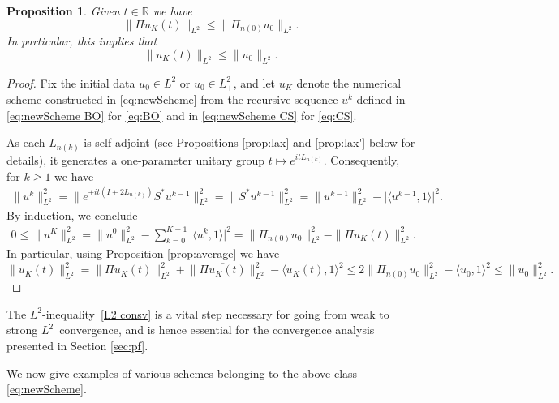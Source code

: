 \documentclass [11pt] {article}
\newtheorem{prop}[thm]{Proposition}
\newcommand{\<}{\langle}
\renewcommand{\>}{\rangle}
\begin{document}
\begin{prop}\label{prop:L2 consv}
Given $t \in \mathbb{R}$ we have 
\begin{equation}
\|\Pi u_{K}(t)\|_{L^2} \le  \| \Pi_{n(0)} u_0\|_{L^2}.
\label{L2 consv}
\end{equation}
In particular, this implies that 
\begin{equation}\label{eq:l2-est}
\| u_K(t)\|_{L^2} \le \| u_0\|_{L^2}.
\end{equation}
\end{prop}
\begin{proof}
Fix the initial data $u_0\in L^2$ or $u_0 \in L^2_{+}$, and let $u_K$ denote the numerical scheme constructed in \eqref{eq:newScheme} from the recursive sequence $u^k$ defined in \eqref{eq:newScheme BO} for \eqref{eq:BO} and in \eqref{eq:newScheme CS} for \eqref{eq:CS}.

As each $L_{n(k)}$ is self-adjoint (see Propositions \ref{prop:lax} and \ref{prop:lax'} below for details), it generates a one-parameter unitary group $t\mapsto e^{itL_{n(k)}}$.  Consequently, for $k\geq 1$ we have
\begin{align*}
\| u^k \|_{L^2}^2 
= \| e^{\pm it(I+2L_{n(k)})} S^* u^{k-1} \|_{L^2}^2 
= \| S^* u^{k-1} \|_{L^2}^2 
= \| u^{k-1} \|_{L^2}^2 - \big| \langle u^{k-1}, 1 \rangle \big|^2 .
\end{align*}
By induction, we conclude
\begin{equation}\label{eq:ineq-L2}
\begin{aligned}
0\le \| u^{K} \|_{L^2}^2 
= \| u^{0} \|_{L^2}^2 - \sum_{k=0}^{K-1} \big| \langle u^{k}, 1 \rangle \big|^2 
= \| \Pi_{n(0)}u_0 \|_{L^2}^2 - \| \Pi u_K(t) \|_{L^2}^2.
\end{aligned}
\end{equation}
In particular, using Proposition \ref{prop:average} we have
\begin{equation}\label{eq:l2bd}
\| u_K(t)\|_{L^2}^2 = \| \Pi u_K(t)\|_{L^2}^2 + \big\| \overline{\Pi u_K(t)}\big\|_{L^2}^2 - \langle u_K(t), 1\rangle^2 
\le 2\| \Pi_{n(0)}u_0\|_{L^2}^2 - \langle u_0, 1\rangle^2 \le \| u_0\|_{L^2}^2.
\end{equation}
\qedhere
\end{proof}
The $L^2$-inequality~\eqref{L2 consv} is a vital step necessary for going from weak to strong $L^2$~convergence, and is hence essential for the convergence analysis presented in Section \ref{sec:pf}.
\newline

We now give examples of various schemes belonging to the above class \eqref{eq:newScheme}.
\end{document}
